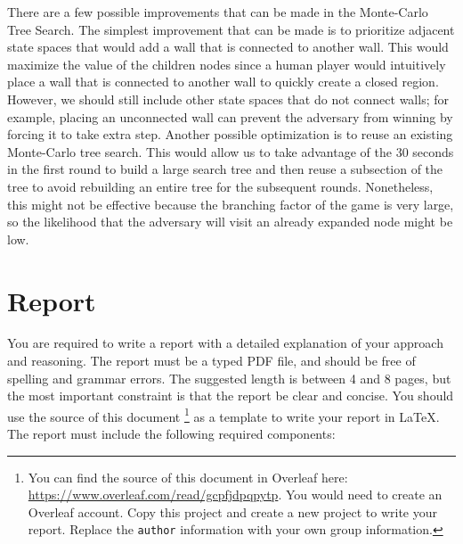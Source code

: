 \documentclass[twoside,11pt]{article}
\begin{document}
There are a few possible improvements that can be made in the Monte-Carlo Tree Search.
The simplest improvement that can be made is to prioritize adjacent state spaces that would add a wall that is connected to another wall.
This would maximize the value of the children nodes since a human player would intuitively place a wall that is connected to another wall to quickly create a closed region.
However, we should still include other state spaces that do not connect walls;
for example, placing an unconnected wall can prevent the adversary from winning by forcing it to take extra step.
Another possible optimization is to reuse an existing Monte-Carlo tree search.
This would allow us to take advantage of the 30 seconds in the first round to build a large search tree and then reuse a subsection of the tree to avoid rebuilding an entire tree for the subsequent rounds.
Nonetheless, this might not be effective because the branching factor of the game is very large, so the likelihood that the adversary will visit an already expanded node might be low. 

\section{Report}

You are required to write a report with a detailed explanation of your approach and reasoning. The report must be a typed PDF file, and should be free of spelling and grammar errors. The suggested length is between 4 and 8 pages, but the most important constraint is that the report be clear and concise. You should use the source of this document \footnote{You can find the source of this document in Overleaf here: \href{https://www.overleaf.com/read/gcpfjdpqpytp}{https://www.overleaf.com/read/gcpfjdpqpytp}. You would need to create an Overleaf account. Copy this project and create a new project to write your report. Replace the \texttt{author} information with your own group information.} as a template to write your report in \LaTeX.  The report must include the following required components:
\end{document}
